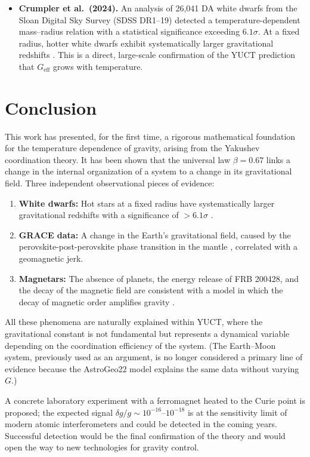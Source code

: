 \documentclass[12pt]{article}
\theoremstyle{remark}
\begin{document}
	\begin{itemize}
		\item \textbf{Crumpler et al.\ (2024).} An analysis of 26,041 DA white dwarfs from the Sloan Digital Sky Survey (SDSS DR1–19) detected a temperature-dependent mass–radius relation with a statistical significance exceeding \(6.1\sigma\). At a fixed radius, hotter white dwarfs exhibit systematically larger gravitational redshifts \cite{Crumpler2024}. This is a direct, large‑scale confirmation of the YUCT prediction that \(G_{\mathrm{eff}}\) grows with temperature.
	\end{itemize}
	
	\section{Conclusion}
	\label{sec:conclusion}
	
	This work has presented, for the first time, a rigorous mathematical foundation for the temperature dependence of gravity, arising from the Yakushev coordination theory. It has been shown that the universal law $\beta = 0.67$ links a change in the internal organization of a system to a change in its gravitational field. Three independent observational pieces of evidence:
	\begin{enumerate}
		\item \textbf{White dwarfs:} Hot stars at a fixed radius have systematically larger gravitational redshifts with a significance of $>6.1\sigma$ \cite{Crumpler2024}.
		\item \textbf{GRACE data:} A change in the Earth's gravitational field, caused by the perovskite-post-perovskite phase transition in the mantle \cite{Rosat2025}, correlated with a geomagnetic jerk.
		\item \textbf{Magnetars:} The absence of planets, the energy release of FRB 200428, and the decay of the magnetic field are consistent with a model in which the decay of magnetic order amplifies gravity \cite{Kaspi2017, Geng2020}.
	\end{enumerate}
	All these phenomena are naturally explained within YUCT, where the gravitational constant is not fundamental but represents a dynamical variable depending on the coordination efficiency of the system. (The Earth–Moon system, previously used as an argument, is no longer considered a primary line of evidence because the AstroGeo22 model explains the same data without varying \(G\).)
	
	A concrete laboratory experiment with a ferromagnet heated to the Curie point is proposed; the expected signal $\delta g/g \sim 10^{-16}$–$10^{-18}$ is at the sensitivity limit of modern atomic interferometers and could be detected in the coming years. Successful detection would be the final confirmation of the theory and would open the way to new technologies for gravity control.
	
\end{document}
